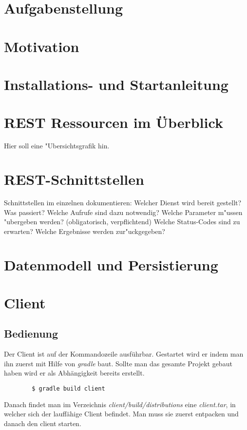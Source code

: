 \documentclass[150]{HSMW-Thesis}
\begin{document}
\begin{Vorwort}
\end{Vorwort}

\Hauptteil

\chapter{Aufgabenstellung}
\chapter{Motivation}
\chapter{Installations- und Startanleitung}
\chapter{REST Ressourcen im Überblick}
Hier soll eine "Ubersichtsgrafik hin.
\chapter{REST-Schnittstellen}
 Schnittstellen im einzelnen dokumentieren:
 Welcher Dienst wird bereit gestellt? Was passiert?
 Welche Aufrufe sind dazu notwendig?
 Welche Parameter m"ussen "ubergeben werden? (obligatorisch, verpflichtend)
 Welche Status-Codes sind zu erwarten?
 Welche Ergebnisse werden zur"uckgegeben? 
\chapter{Datenmodell und Persistierung}
\chapter{Client}

\section{Bedienung}

	Der Client ist auf der Kommandozeile ausführbar. Gestartet wird er indem man ihn zuerst mit Hilfe von \emph{gradle} baut. Sollte man das gesamte Projekt gebaut haben wird er als Abhängigkeit bereits erstellt.
	\begin{verbatim}
		$ gradle build client
	\end{verbatim}
	
	Danach findet man im Verzeichnis \emph{client/build/distributions} eine \emph{client.tar}, in welcher sich der lauffähige Client befindet. Man muss sie zuerst entpacken und danach den client starten.
	
\end{document}
